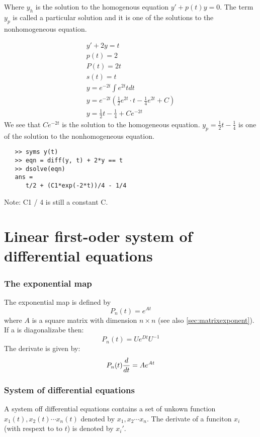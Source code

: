 Where \(y_h\) is the solution to the homogenous equation \(y' + p(t)y = 0\). The term
\(y_p\) is called a particular solution and it is one of the solutions to the nonhomogeneous equation.
\begin{example}
   \begin{gather*}
      y' + 2y = t \\
      p(t) = 2\\
      P(t) = 2t\\
      s(t) = t \\
      y = e^{-2t}\int e^{2t} t dt\\
      y = e^{-2t}\left( \frac{1}{2} e^{2t} \cdot t - \frac{1}{4}e^{2t} + C \right)\\
      y = \frac{1}{2} t- \frac{1}{4} + C e^{-2t}
   \end{gather*}
   We see that  \(Ce^{-2t}\) is the solution to the homogeneous equation.
   \(y_p = \frac{1}{2} t- \frac{1}{4}\) is one of the solution to the nonhomogeneous equation.
\end{example}
\begin{matlab}
   \begin{lstlisting}
   >> syms y(t)
   >> eqn = diff(y, t) + 2*y == t
   >> dsolve(eqn)
   ans =
      t/2 + (C1*exp(-2*t))/4 - 1/4
  \end{lstlisting}
   Note: C1 / 4 is still a constant C.
\end{matlab}
\section{Linear first-oder system of differential equations}
\subsubsection{The exponential map}
The exponential map is defined by
\begin{equation}
   P_n(t) = e^{At}
\end{equation}
where \(A\) is a square matrix with dimension \(n \times n\) (see also \ref{sec:matrixexponent}).
If a is diagonalizabe then:
\begin{equation}
   P_n(t) = Ue^{Dt} U^{-1}
\end{equation}
The derivate is given by:
\begin{equation}
   P_n(t) \frac{d}{dt} = A e^{At}
\end{equation}
\subsubsection{System of differential equations}
A system off differential equations contains a set of unkown function \(x_1(t), x_2(t) \cdots x_n(t) \) denoted by \(x_1, x_2 \cdots x_n\). The derivate of a funciton \(x_i\) (with respext to to \(t\)) is denoted by
\(x_i'\).
